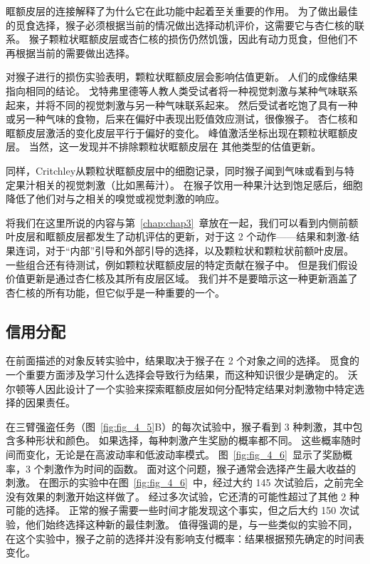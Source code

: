 眶额皮层的连接解释了为什么它在此功能中起着至关重要的作用。
为了做出最佳的觅食选择，猴子必须根据当前的情况做出选择动机评价，这需要它与杏仁核的联系。
猴子颗粒状眶额皮层或杏仁核的损伤仍然饥饿，因此有动力觅食，但他们不再根据当前的需要做出选择。\par


对猴子进行的损伤实验表明，颗粒状眶额皮层会影响估值更新。
人们的成像结果指向相同的结论。
戈特弗里德等人\cite{gottfried2003encoding}教人类受试者将一种视觉刺激与某种气味联系起来，并将不同的视觉刺激与另一种气味联系起来。
然后受试者吃饱了具有一种或另一种气味的食物，后来在偏好中表现出贬值效应测试，很像猴子。
杏仁核和眶额皮层激活的变化皮层平行于偏好的变化。
峰值激活坐标出现在颗粒状眶额皮层。
当然，这一发现并不排除颗粒状眶额皮层在
其他类型的估值更新。\par


同样，Critchley\cite{critchley1996hunger}从颗粒状眶额皮层中的细胞记录，同时猴子闻到气味或看到与特定果汁相关的视觉刺激（比如黑莓汁）。
在猴子饮用一种果汁达到饱足感后，细胞降低了他们对与之相关的嗅觉或视觉刺激的响应。\par


将我们在这里所说的内容与第~\ref{chap:chap3}~章放在一起，我们可以看到内侧前额叶皮层和眶额皮层都发生了动机评估的更新，对于这 2 个动作——结果和刺激-结果连词，对于“内部”引导和外部引导的选择，以及颗粒状和颗粒状前额叶皮层。
一些组合还有待测试，例如颗粒状眶额皮层的特定贡献在猴子中。
但是我们假设价值更新是通过杏仁核及其所有皮层区域。
我们并不是要暗示这一种更新涵盖了杏仁核的所有功能，但它似乎是一种重要的一个。\par



\subsection{信用分配}

在前面描述的对象反转实验中，结果取决于猴子在 2 个对象之间的选择。
觅食的一个重要方面涉及学习什么选择会导致行为结果，而这种知识很少是确定的。
沃尔顿等人\cite{walton2010separable}因此设计了一个实验来探索眶额皮层如何分配特定结果对刺激物中特定选择的因果责任。\par


在三臂强盗任务（图~\ref{fig:fig_4_5}B）的每次试验中，猴子看到 3 种刺激，其中包含多种形状和颜色。
如果选择，每种刺激产生奖励的概率都不同。
这些概率随时间而变化，无论是在高波动率和低波动率模式。
图~\ref{fig:fig_4_6}~显示了奖励概率，3 个刺激作为时间的函数。
面对这个问题，猴子通常会选择产生最大收益的刺激。
在图示的实验中在图~\ref{fig:fig_4_6}~中，经过大约 145 次试验后，之前完全没有效果的刺激开始这样做了。
经过多次试验，它还清的可能性超过了其他 2 种可能的选择。
正常的猴子需要一些时间才能发现这个事实，但之后大约 150 次试验，他们始终选择这种新的最佳刺激。
值得强调的是，与一些类似的实验不同，在这个实验中，猴子之前的选择并没有影响支付概率：结果根据预先确定的时间表变化。\par


